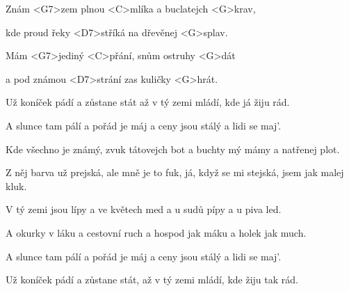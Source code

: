 

\zs
Znám <G7>zem plnou <C>mlíka a buclatejch <G>krav,

kde proud řeky <D7>stříká na dřevěnej <G>splav.

Mám <G7>jediný <C>přání, snům ostruhy <G>dát

a pod známou <D7>strání zas kuličky <G>hrát.
\ks

\zr
Už koníček pádí a zůstane stát až v tý zemi mládí, kde já žiju rád.

A slunce tam pálí a pořád je máj a ceny jsou stálý a lidi se maj'.
\kr

\zs
Kde všechno je známý, zvuk tátovejch bot a buchty mý mámy a natřenej plot.

Z něj barva už prejská, ale mně je to fuk, já, když se mi stejská, jsem jak malej kluk.
\ks

\zr\kr

\zs
V tý zemi jsou lípy a ve květech med a u sudů pípy a u piva led.

A okurky v láku a cestovní ruch a hospod jak máku a holek jak much.
\ks

\zr
A slunce tam pálí a pořád je máj a ceny jsou stálý a lidi se maj'.

Už koníček pádí a zůstane stát, až v tý zemi mládí, kde žiju tak rád.
\kr

\kp

